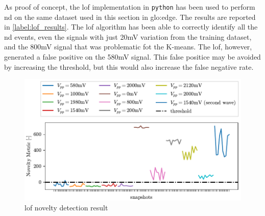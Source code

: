 As proof of concept, the \gls{lof} implementation in \texttt{python} has been used to perform \gls{nd} on the same dataset used in this section in \gls{glo:edge}. The results are reported in \autoref{label:lof_results}. The \gls{lof} algorithm has been able to correctly identify all the \gls{nd} events, even the signals with just 20mV variation from the training dataset, and the 800mV signal that was problematic fot the K-means. The \gls{lof}, however, generated a false positive on the 580mV signal. This false positice may be avoided by increasing the threshold, but this would also increase the false negative rate. 

\begin{figure}
    \centering
    \includegraphics{Images/shaker/Test02_LOF.pdf}
    \caption{\gls{lof} novelty detection result}
    \label{fig:lof_results}
\end{figure}